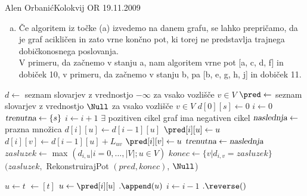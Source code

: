 \begin{naloga}{Alen Orbanić}{Kolokvij OR 19.11.2009}
\begin{odgovor}
\begin{enumerate}[(a)]
Ker gre za izpeljavo Floyd- Warshallovega algoritma, je časovna zahtevnost
enaka $o(n^3)$, kjer je $n$ število vozlišč.

\item Če algoritem iz točke (a) izvedemo na danem grafu, se lahko prepričamo, 
da je graf acikličen in zato vrne končno pot, ki torej ne predstavlja trajnega
dobičkonosnega poslovanja.  \\
V primeru, da začnemo v stanju a, nam algoritem vrne pot [a, c, d, f] in 
dobiček 10, v primeru, da začnemo v stanju b, pa [b, e, g, h, j] in 
dobiček 11.

\end{enumerate}
\begin{slika}
\end{slika}

\begin{slika}
\end{slika}
    
\newpage
\begin{small}
\begin{algorithmic}
    \State $d \gets$ seznam slovarjev z vrednostjo $- \infty$ za vsako vozlišče $v \in V$
    \State $\pred \gets$ seznam slovarjev z vrednostjo $\Null$
    za vsako vozlišče $v \in V$
    \State $d[0][s] \gets 0$
    \State $i \gets 0$
    \State $\text{\sl trenutna} \gets \{s\}$
        \State $i \gets i+1$
         \hfill $\exists$ pozitiven cikel
            \State \Return graf ima negativen cikel 
        \EndIf
        \State $\text{\sl{naslednja}} \gets$ prazna množica
            \State $d[i][u] \gets d[i-1][u]$
            \State $\pred[i][u] \gets u$
        \EndFor
                \State $d[i][v] \gets d[i-1][u] +  L_{uv}$
                \State $\pred[i][v] \gets u$
            \EndIf
        \EndFor
        \State $\text{\sl{trenutna}} \gets \text{\sl{naslednja}}$
    \EndWhile
    \State $zasluzek \gets$ max $({d_{i,u} |i=0, \ldots , |V|;  u \in V})$
    \State $konec \gets \{v | d_{i,v}= zasluzek \}$
    \State \Return $(zasluzek,$ RekonstruirajPot $(pred,konec)$, $\Null$)
\EndFunction
\end{algorithmic}
\end{small}

    \begin{small}
    \begin{algorithmic}
        \State $u \gets t$
         $\gets [t]$
            \State $u \gets \pred[i][u]$
            $.\append(u)$
            \State $i \gets i - 1$
        \EndWhile
        $.\reverse()$
        \State {}
    \EndFunction
\end{algorithmic}
\end{small}


\end{odgovor}
\end{naloga}
